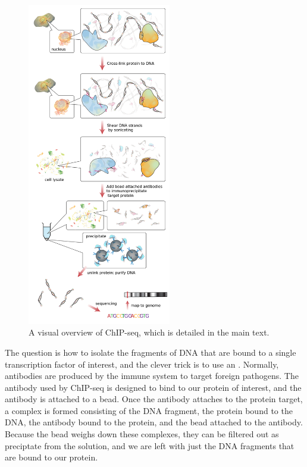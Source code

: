 \begin{figure}[hp]
\centering
\mySfFamily
\includegraphics[width = 0.56\textwidth]{../images/ChIP-seq_workflow.png}
\caption{A visual overview of ChIP-seq, which is detailed in the main text.}
\label{fig:ChIP-seq_workflow}
\end{figure}

The question is how to isolate the fragments of DNA that are bound to a single transcription factor of interest, and the clever trick is to use an . Normally, antibodies are produced by the immune system to target foreign pathogens. The antibody used by ChIP-seq is designed to bind to our protein of interest, and the antibody is attached to a bead. Once the antibody attaches to the protein target, a complex is formed consisting of the DNA fragment, the protein bound to the DNA, the antibody bound to the protein, and the bead attached to the antibody. Because the bead weighs down these complexes, they can be filtered out as preciptate from the solution, and we are left with just the DNA fragments that are bound to our protein.

